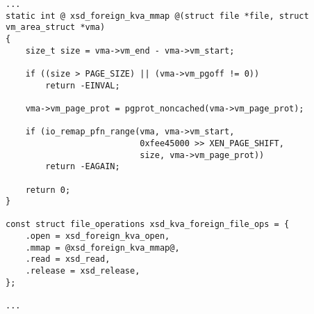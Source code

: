 \begin{lstlisting}[caption=Added file interface for mapping DomU xenstore interface page into userspace in drivers/xen/xenfs/xenstored.c file, label={xvd_foreign},frame=single,style=base]
...
static int @ xsd_foreign_kva_mmap @(struct file *file, struct vm_area_struct *vma)
{
    size_t size = vma->vm_end - vma->vm_start;

    if ((size > PAGE_SIZE) || (vma->vm_pgoff != 0))
        return -EINVAL;
        
    vma->vm_page_prot = pgprot_noncached(vma->vm_page_prot);

    if (io_remap_pfn_range(vma, vma->vm_start,
                           0xfee45000 >> XEN_PAGE_SHIFT,
                           size, vma->vm_page_prot))
        return -EAGAIN; 

    return 0;
}

const struct file_operations xsd_kva_foreign_file_ops = {
    .open = xsd_foreign_kva_open,
    .mmap = @xsd_foreign_kva_mmap@,
    .read = xsd_read,
    .release = xsd_release,
};

...
\end{lstlisting}



